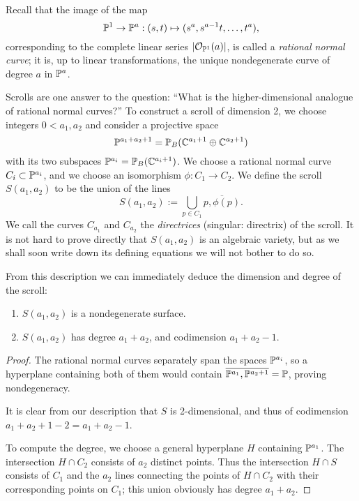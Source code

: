 Recall that the image of the map 
$$
{\mathbb P}^1\to{\mathbb P}^a: (s,t) \mapsto (s^a, s^{a-1}t, \dots, t^a),
$$
corresponding to the complete linear series
$|{\mathcal O}_{{\mathbb P}^1}(a)|$, is called a \emph{rational normal curve}; it is, up to linear transformations, the unique nondegenerate curve of degree $a$ in ${\mathbb P}^a$.

Scrolls are one answer to the question: ``What is the higher-dimensional analogue of rational normal curves?'' To construct a scroll of dimension 2, we choose integers $0<a_1, a_2$ and consider  a projective space 
$$
{\mathbb P}^{a_1+a_2+1} = {\mathbb P}_B({\mathbb C}^{a_1+1}\oplus {\mathbb C}^{a_2+1})
$$
with its two subspaces ${\mathbb P}^{a_i} = {\mathbb P}_B({\mathbb C}^{a_i+1})$. We choose a rational normal curve $C_i\subset {\mathbb P}^{a_i}$, and we choose an isomorphism $\phi: C_1\to C_2$. We define the scroll $S(a_1, a_2)$ to be the union of the lines
$$
S(a_1,a_2) := \bigcup_{p\in C_1} \overline{p, \phi(p)}.
$$
We call the curves $C_{a_{1}}$ and $C_{a_{2}}$ the \emph{directrices} (singular: directrix) of the scroll.
It is not hard to prove directly that $S(a_1,a_2)$ is an algebraic variety, but as we shall soon write down its defining equations we will not bother to do so. 

From this description we can immediately deduce the dimension and degree of the scroll:
\begin{proposition}
\begin{enumerate}
\item $S(a_1,a_2)$ is a nondegenerate surface.
 \item $S(a_1,a_2)$ has degree $a_1+a_2$, and codimension $a_1+a_2-1.$
 \end{enumerate}

\end{proposition}\label{deg and codim}
\begin{proof}
 The rational normal curves separately span the spaces ${\mathbb P}^{a_i}$, so a hyperplane containing both of them would contain $\overline{{\mathbb P}^{a_1}, {\mathbb P}^{a_{2}+1}} = {\mathbb P}$, proving nondegeneracy. 
 
 It is clear from our description that $S$ is 2-dimensional, and thus of
codimension $a_{1}+a_{2}+1 -2 = a_{1}+a_{2}-1$. 

To compute the degree, we choose a general hyperplane $H$ containing ${\mathbb P}^{a_{1}}$. The intersection $H\cap C_{2}$ consists of $a_{2}$ distinct points. Thus the intersection $H\cap S$ consists of $C_{1}$ and the $a_{2}$ lines connecting 
the points of $H\cap C_{2}$ with their corresponding points on $C_{1}$; this union obviously has degree $a_{1}+a_{2}$.
\end{proof}

